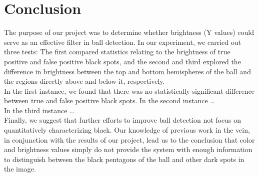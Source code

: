 \documentclass[11pt, twocolumn]{article}
\begin{document}
\section{Conclusion}
The purpose of our project was to determine whether brightness (Y values) could serve as an effective filter in ball detection. In our experiment, we carried out three tests: The first compared statistics relating to the brightness of true positive and false positive black spots, and the second and third explored the difference in brightness between the top and bottom hemispheres of the ball and the regions directly above and below it, respectively. \\
\indent In the first instance, we found that there was no statistically significant difference between true and false positive black spots.
\indent In the second instance \ldots \\
\indent In the third instance \ldots \\
Finally, we suggest that further efforts to improve ball detection not focus on quantitatively characterizing black. Our knowledge of previous work in the vein, in conjunction with the results of our project, lead us to the conclusion that color and brightness values simply do not provide the system with enough information to distinguish between the black pentagons of the ball and other dark spots in the image.
\end{document}
